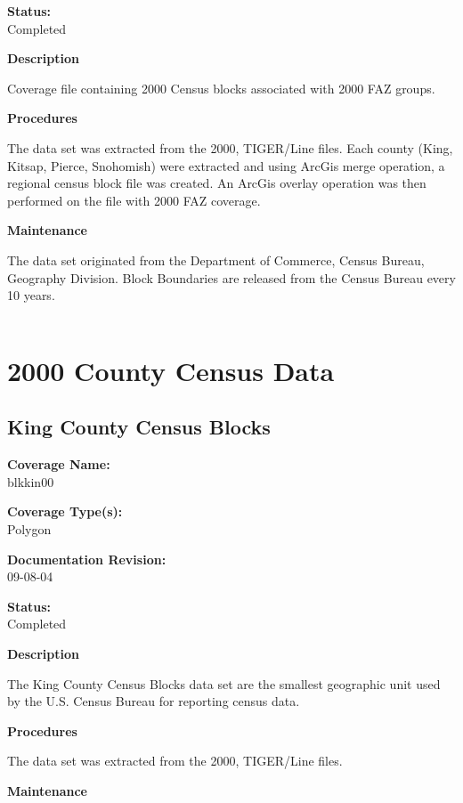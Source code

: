 {\bf \large Status:}\\
Completed

{\bf \large Description}

Coverage file containing 2000 Census blocks associated with 2000
FAZ groups.

{\bf \large Procedures}

The data set was extracted from the 2000, TIGER/Line files. Each
county (King, Kitsap, Pierce, Snohomish) were extracted and using
ArcGis merge operation, a regional census block file was created.
An ArcGis overlay operation was then performed on the file with
2000 FAZ coverage.

{\bf \large Maintenance}

The data set originated from the Department of Commerce, Census
Bureau, Geography Division. Block Boundaries are released from the
Census Bureau every 10 years.

\begin{landscape}
\begin{longtable}{llrrrrrc}

\end{longtable}
\end{landscape}
\newpage

\section{2000 County Census Data}
\subsection{King County Census Blocks}

{\bf \large Coverage Name:}\\
blkkin00

{\bf \large Coverage Type(s):}\\
Polygon

{\bf \large Documentation Revision:}\\
09-08-04

{\bf \large Status:}\\
Completed

{\bf \large Description}

The King County Census Blocks data set are the smallest geographic
unit used by the U.S. Census Bureau for reporting census data.

{\bf \large Procedures}

The data set was extracted from the 2000, TIGER/Line files.

{\bf \large Maintenance}

